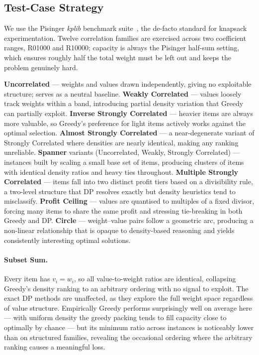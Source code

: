 \documentclass[11pt, a4paper]{article}
\begin{document}
\subsection{Test-Case Strategy}
We use the Pisinger \emph{kplib} benchmark suite~\cite{pisinger2003,kplib}, the
de-facto standard for knapsack experimentation. Twelve correlation families are
exercised across two coefficient ranges, R01000 and R10000; capacity is always
the Pisinger half-sum setting, which ensures roughly half the total weight must
be left out and keeps the problem genuinely hard.

\medskip\noindent
\textbf{Uncorrelated} --- weights and values drawn independently, giving no
exploitable structure; serves as a neutral baseline.
\textbf{Weakly Correlated} --- values loosely track weights within a band,
introducing partial density variation that Greedy can partially exploit.
\textbf{Inverse Strongly Correlated} --- heavier items are always more
valuable, so Greedy's preference for light items actively works against the
optimal selection.
\textbf{Almost Strongly Correlated} --- a near-degenerate variant of Strongly
Correlated where densities are nearly identical, making any ranking unreliable.
\textbf{Spanner} variants (Uncorrelated, Weakly, Strongly Correlated) ---
instances built by scaling a small base set of items, producing clusters of
items with identical density ratios and heavy ties throughout.
\textbf{Multiple Strongly Correlated} --- items fall into two distinct profit
tiers based on a divisibility rule, a two-level structure that DP resolves
exactly but density heuristics tend to misclassify.
\textbf{Profit Ceiling} --- values are quantised to multiples of a fixed
divisor, forcing many items to share the same profit and stressing tie-breaking
in both Greedy and DP.
\textbf{Circle} --- weight--value pairs follow a geometric arc, producing a
non-linear relationship that is opaque to density-based reasoning and yields
consistently interesting optimal solutions.

\paragraph{Subset Sum.}
Every item has $v_i = w_i$, so all value-to-weight ratios are identical,
collapsing Greedy's density ranking to an arbitrary ordering with no signal to
exploit. The exact DP methods are unaffected, as they explore the full weight
space regardless of value structure. Empirically Greedy performs surprisingly
well on average here --- with uniform density the greedy packing tends to fill
capacity close to optimally by chance --- but its minimum ratio across instances
is noticeably lower than on structured families, revealing the occasional
ordering where the arbitrary ranking causes a meaningful loss.
\end{document}
